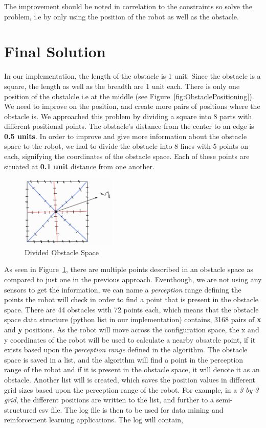 The improvement should be noted in correlation to the constraints so solve the problem, i.e by only using the position of the robot as well as the obstacle.

\section{Final Solution}
In our implementation, the length of the obstacle is 1 unit. Since the obstacle is a square, the length as well as the breadth are 1 unit each.
There is only one position of the obstalcle i.e at the middle (see Figure~\ref{fig:ObstaclePositioning}). We need to improve on the position, and create more pairs of positions where the obstacle is.
We approached this problem by dividing a square into 8 parts with different positional points. The obstacle's distance from the center to an edge is \textbf{0.5 units}.
In order to improve and give more information about the obstacle space to the robot, we had to divide the obstacle into 8 lines with 5 points on each, signifying the coordinates of the obstacle space.
Each of these points are situated at \textbf{0.1 unit} distance from one another. 

\begin{figure}[th]
    \centering
    \includegraphics[width=0.4\textwidth]{Figures/improved-obstacle-space.jpg}
    \decoRule
    \caption[]{Divided Obstacle Space}
    \label{fig:ObstacleSpaceDivided}
\end{figure}

As seen in Figure~\ref{fig:ObstacleSpaceDivided}, there are multiple points described in an obstacle space as compared to just one in the previous approach.
Eventhough, we are not using any sensors to get the information, we can name a \textit{perception} range defining the points the robot will check in order to find a point that is present in the obstacle space.
There are 44 obstacles with 72 points each, which means that the obstacle space data structure (python list in our implementation) contains, 3168 pairs of \textbf{x} and \textbf{y} positions.
As the robot will move across the configuration space, the x and y coordinates of the robot will be used to calculate a nearby obsatcle point, if it exists based upon the \textit{perception range} defined in the algorithm.
The obstacle space is saved in a list, and the algorithm will find a point in the perception range of the robot and if it is present in the obstacle space, it will denote it as an obstacle.
Another list will is created, which saves the position values in different grid sizes based upon the perception range of the robot. For example, in a \textit{3 by 3 grid}, the different positions are written to the list, and further to a semi-structured csv file. The log file is then to be used for data mining and reinforcement learning applications.
The log will contain,

